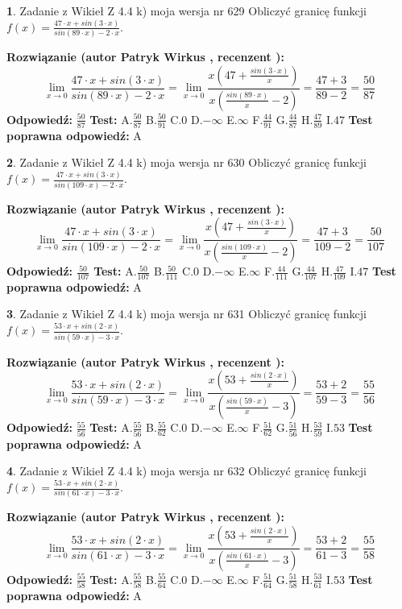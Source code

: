 \documentclass[12pt, a4paper]{article}
\theoremstyle{definition} %
\newtheorem{zad}{}
\newcommand{\zadStart}[1]{\begin{zad}#1\newline}
\newcommand{\zadStop}{\end{zad}}
\newcommand{\rozwStart}[2]{\noindent \textbf{Rozwiązanie (autor #1 , recenzent #2): }\newline}
\newcommand{\rozwStop}{\newline}
\newcommand{\odpStart}{\noindent \textbf{Odpowiedź:}\newline}
\newcommand{\odpStop}{\newline}
\newcommand{\testStart}{\noindent \textbf{Test:}\newline}
\newcommand{\testStop}{\newline}
\newcommand{\kluczStart}{\noindent \textbf{Test poprawna odpowiedź:}\newline}
\newcommand{\kluczStop}{\newline}
\begin{document}
\zadStart{Zadanie z Wikieł Z 4.4 k) moja wersja nr 629}
Obliczyć granicę funkcji $f(x)=\frac{47\cdot x +sin(3\cdot x)}{sin(89\cdot x) -2\cdot x}$.
\zadStop
\rozwStart{Patryk Wirkus}{}
$$\lim\limits_{x\to 0}\frac{47\cdot x +sin(3\cdot x)}{sin(89\cdot x) -2\cdot x}
=\lim\limits_{x\to 0}\frac{x(47+\frac{sin(3\cdot x)}{x})}{x(\frac{sin(89\cdot x)}{x}-2)}
=\frac{47+3}{89-2} = \frac{50}{87}$$
\rozwStop
\odpStart
$\frac{50}{87}$
\odpStop
\testStart
A.$\frac{50}{87}$
B.$\frac{50}{91}$
C.$0$
D.$-\infty$
E.$\infty$
F.$\frac{44}{91}$
G.$\frac{44}{87}$
H.$\frac{47}{89}$
I.$47$
\testStop
\kluczStart
A
\kluczStop



\zadStart{Zadanie z Wikieł Z 4.4 k) moja wersja nr 630}
Obliczyć granicę funkcji $f(x)=\frac{47\cdot x +sin(3\cdot x)}{sin(109\cdot x) -2\cdot x}$.
\zadStop
\rozwStart{Patryk Wirkus}{}
$$\lim\limits_{x\to 0}\frac{47\cdot x +sin(3\cdot x)}{sin(109\cdot x) -2\cdot x}
=\lim\limits_{x\to 0}\frac{x(47+\frac{sin(3\cdot x)}{x})}{x(\frac{sin(109\cdot x)}{x}-2)}
=\frac{47+3}{109-2} = \frac{50}{107}$$
\rozwStop
\odpStart
$\frac{50}{107}$
\odpStop
\testStart
A.$\frac{50}{107}$
B.$\frac{50}{111}$
C.$0$
D.$-\infty$
E.$\infty$
F.$\frac{44}{111}$
G.$\frac{44}{107}$
H.$\frac{47}{109}$
I.$47$
\testStop
\kluczStart
A
\kluczStop



\zadStart{Zadanie z Wikieł Z 4.4 k) moja wersja nr 631}
Obliczyć granicę funkcji $f(x)=\frac{53\cdot x +sin(2\cdot x)}{sin(59\cdot x) -3\cdot x}$.
\zadStop
\rozwStart{Patryk Wirkus}{}
$$\lim\limits_{x\to 0}\frac{53\cdot x +sin(2\cdot x)}{sin(59\cdot x) -3\cdot x}
=\lim\limits_{x\to 0}\frac{x(53+\frac{sin(2\cdot x)}{x})}{x(\frac{sin(59\cdot x)}{x}-3)}
=\frac{53+2}{59-3} = \frac{55}{56}$$
\rozwStop
\odpStart
$\frac{55}{56}$
\odpStop
\testStart
A.$\frac{55}{56}$
B.$\frac{55}{62}$
C.$0$
D.$-\infty$
E.$\infty$
F.$\frac{51}{62}$
G.$\frac{51}{56}$
H.$\frac{53}{59}$
I.$53$
\testStop
\kluczStart
A
\kluczStop



\zadStart{Zadanie z Wikieł Z 4.4 k) moja wersja nr 632}
Obliczyć granicę funkcji $f(x)=\frac{53\cdot x +sin(2\cdot x)}{sin(61\cdot x) -3\cdot x}$.
\zadStop
\rozwStart{Patryk Wirkus}{}
$$\lim\limits_{x\to 0}\frac{53\cdot x +sin(2\cdot x)}{sin(61\cdot x) -3\cdot x}
=\lim\limits_{x\to 0}\frac{x(53+\frac{sin(2\cdot x)}{x})}{x(\frac{sin(61\cdot x)}{x}-3)}
=\frac{53+2}{61-3} = \frac{55}{58}$$
\rozwStop
\odpStart
$\frac{55}{58}$
\odpStop
\testStart
A.$\frac{55}{58}$
B.$\frac{55}{64}$
C.$0$
D.$-\infty$
E.$\infty$
F.$\frac{51}{64}$
G.$\frac{51}{58}$
H.$\frac{53}{61}$
I.$53$
\testStop
\kluczStart
A
\kluczStop
\end{document}
